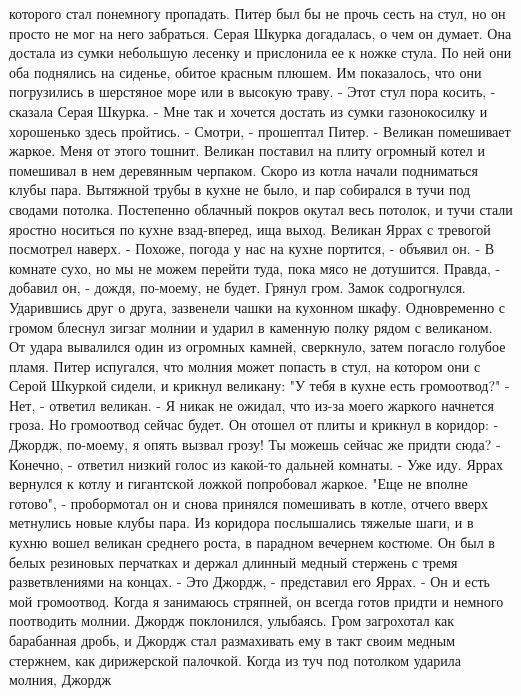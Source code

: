которого стал понемногу пропадать.
    Питер был бы не прочь сесть на стул, но он просто не мог на него 
забраться. Серая Шкурка догадалась, о чем он думает. Она достала из 
сумки небольшую лесенку и прислонила ее к ножке стула. По ней они оба 
поднялись на сиденье, обитое красным плюшем. Им показалось, что они 
погрузились в шерстяное море или в высокую траву.
    - Этот стул пора косить, - сказала Серая Шкурка. - Мне так и 
хочется достать из сумки газонокосилку и хорошенько здесь пройтись.
    - Смотри, - прошептал Питер. - Великан помешивает жаркое. Меня от 
этого тошнит.
    Великан поставил на плиту огромный котел и помешивал в нем 
деревянным черпаком. Скоро из котла начали подниматься клубы пара. 
Вытяжной трубы в кухне не было, и пар собирался в тучи под сводами 
потолка. Постепенно облачный покров окутал весь потолок, и тучи стали 
яростно носиться по кухне взад-вперед, ища выход.
    Великан Яррах с тревогой посмотрел наверх.
    - Похоже, погода у нас на кухне портится, - объявил он. - В 
комнате сухо, но мы не можем перейти туда, пока мясо не дотушится. 
Правда, - добавил он, - дождя, по-моему, не будет.
    Грянул гром. Замок содрогнулся. Ударившись друг о друга, зазвенели 
чашки на кухонном шкафу. Одновременно с громом блеснул зигзаг молнии и 
ударил в каменную полку рядом с великаном. От удара вывалился один из 
огромных камней, сверкнуло, затем погасло голубое пламя.
    Питер испугался, что молния может попасть в стул, на котором они с 
Серой Шкуркой сидели, и крикнул великану: "У тебя в кухне есть 
громоотвод?"
    - Нет, - ответил великан. - Я никак не ожидал, что из-за моего 
жаркого начнется гроза. Но громоотвод сейчас будет.
    Он отошел от плиты и крикнул в коридор:
    - Джордж, по-моему, я опять вызвал грозу! Ты можешь сейчас же 
придти сюда?
    - Конечно, - ответил низкий голос из какой-то дальней комнаты. - 
Уже иду.
    Яррах вернулся к котлу и гигантской ложкой попробовал жаркое. "Еще 
не вполне готово", - пробормотал он и снова принялся помешивать в 
котле, отчего вверх метнулись новые клубы пара.
    Из коридора послышались тяжелые шаги, и в кухню вошел великан 
среднего роста, в парадном вечернем костюме. Он был в белых резиновых 
перчатках и держал длинный медный стержень с тремя разветвлениями на 
концах.
    - Это Джордж, - представил его Яррах. - Он и есть мой громоотвод. 
Когда я занимаюсь стряпней, он всегда готов придти и немного 
поотводить молнии.
    Джордж поклонился, улыбаясь. Гром загрохотал как барабанная дробь, 
и Джордж стал размахивать ему в такт своим медным стержнем, как 
дирижерской палочкой. Когда из туч под потолком ударила молния, Джордж 
